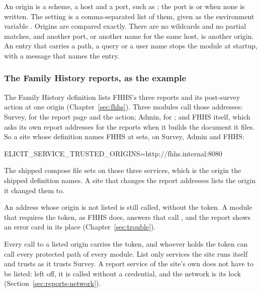 \documentclass[11pt, a4paper]{article}
\begin{document}
An origin is a scheme, a host and a port, such as ; the port
is  or  when none is written. The setting is a comma-separated list of them,
given as the environment variable . Origins are compared
exactly. There are no wildcards and no partial matches, and another port, or another name for
the same host, is another origin. An entry that carries a path, a query or a user name stops
the module at startup, with a message that names the entry.

\subsubsection*{The Family History reports, as the example}

The Family History definition lists FHHS's three reports and its post-survey action at one
origin (Chapter~\ref{sec:fhhs}). Three modules call those addresses: Survey, for the report
page and the action; Admin, for ; and FHHS itself, which asks its own report
addresses for the reports when it builds the document it files. So a site whose definition
names FHHS at  sets, on Survey, Admin and FHHS:

\begin{elicitcmd}
ELICIT_SERVICE_TRUSTED_ORIGINS=http://fhhs.internal:8080
\end{elicitcmd}

The shipped compose file sets  on those three services,
which is the origin the shipped definition names. A site that changes the report addresses
lists the origin it changed them to.

An address whose origin is not listed is still called, without the token. A module that
requires the token, as FHHS does, answers that call , and the report shows an error
card in its place (Chapter~\ref{sec:trouble}).

\begin{elicitsecurity}
Every call to a listed origin carries the token, and whoever holds the token can call every
protected path of every module. List only services the site runs itself and trusts as it
trusts Survey. A report service of the site's own does not have to be listed: left off, it is
called without a credential, and the network is its lock
(Section~\ref{sec:reports-network}).
\end{elicitsecurity}
\end{document}

